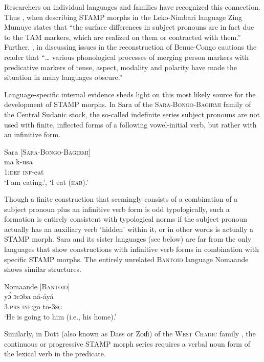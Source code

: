 \documentclass[output=paper]{langsci/langscibook}
\begin{document}
Researchers on individual languages and families have recognized this connection. Thus \citet[101]{Shimizu1983}, when describing STAMP morphs in the Leko-Nimbari language Zing Mumuye states that ``the surface differences in subject pronouns are in fact due to the TAM markers, which are realized on them or contracted with them.'' Further, \citet[35]{Babaev2010}, in discussing issues in the reconstruction of Benue-Congo cautions the reader that ``… various phonological processes of merging person markers with predicative markers of tense, aspect, modality and polarity have made the situation in many languages obscure.''

  Language-specific internal evidence sheds light on this most likely source for the development of STAMP morphs. In Sara of the \textsc{Sara-Bongo-Bagirmi} family of the Central Sudanic stock, the so-called indefinite series subject pronouns are not used with finite, inflected forms of a following vowel-initial verb, but rather with an infinitive form.
  
  \ea\label{ex:anderson:34}
  Sara \citep[75]{TuckerBryan1966}      [\textsc{Sara-Bongo-Bagirmi}]\\
\gll ma    k-usa\\
1:\textsc{def}  \textsc{inf}-eat\\
\glt `I am eating.', `I eat (\textsc{hab}).' 
\z

Though a finite construction that seemingly consists of a combination of a subject pronoun  plus an infinitive verb form is odd typologically, such a formation is entirely consistent with typological norms if the subject pronoun actually has an auxiliary verb `hidden' within it, or in other words is actually a STAMP morph. Sara and its sister languages (see  below) are far from the only languages that show constructions with infinitive verb forms in combination with specific STAMP morphs. The entirely unrelated \textsc{Bantoid} language Nomaande shows similar structures. 

\ea\label{ex:anderson:35}
Nomaande \citep[22]{Wilkendorf2001}          \textsc{[Bantoid]}\\
\gll y\'{ɔ}    ɔcɔba  ná-áyá\\
3.\textsc{prs}  \textsc{inf}:go  to-\textsc{3sg}\\
\glt `He is going to him (i.e., his home).' 
\z

Similarly, in Dott (also known as Dass or Zoɗi) of the \textsc{West Chadic} family , the continuous or progressive STAMP morph series requires a verbal noun form of the lexical verb in the predicate. 
\end{document}
